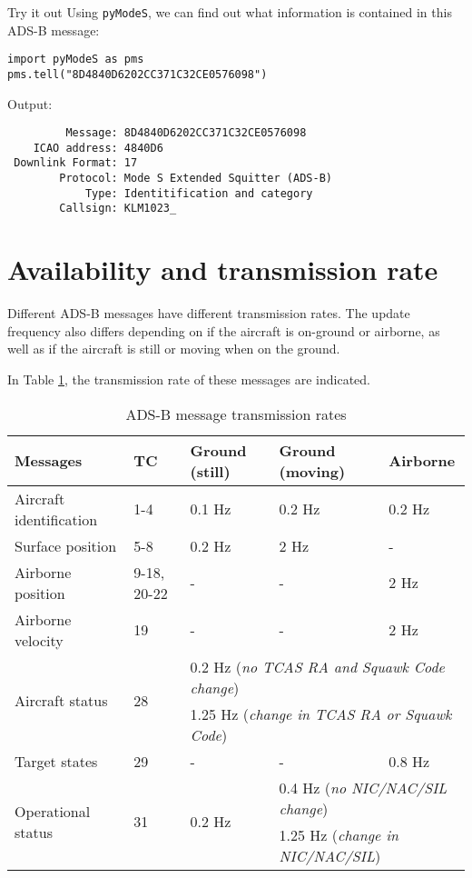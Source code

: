 \begin{notebox}{Try it out}
  Using \texttt{pyModeS}, we can find out what information is contained in this ADS-B message:

\begin{verbatim}
import pyModeS as pms
pms.tell("8D4840D6202CC371C32CE0576098")
\end{verbatim}

Output:

\begin{verbatim}
         Message: 8D4840D6202CC371C32CE0576098 
    ICAO address: 4840D6 
 Downlink Format: 17 
        Protocol: Mode S Extended Squitter (ADS-B) 
            Type: Identitification and category 
        Callsign: KLM1023_ 
\end{verbatim}
  

\end{notebox}



\section{Availability and transmission rate}

Different ADS-B messages have different transmission rates. The update frequency also differs depending on if the aircraft is on-ground or airborne, as well as if the aircraft is still or moving when on the ground.

In Table \ref{tb:adsb-transmission-rate}, the transmission rate of these messages are indicated.

\begin{table}[ht]
  \footnotesize
  \centering
  \caption{ADS-B message transmission rates}
  \label{tb:adsb-transmission-rate}
  \begin{tabular}{|l|l|l|l|l|}
  \hline
  \textbf{Messages} & \textbf{TC} & \textbf{Ground (still)} & \textbf{Ground (moving)} & \textbf{Airborne} \\ \hline
  Aircraft identification & 1-4 & 0.1 Hz & 0.2 Hz & 0.2 Hz \\ \hline
  Surface position & 5-8 & 0.2 Hz & 2 Hz & - \\ \hline
  Airborne position & 9-18, 20-22 & - & - & 2 Hz \\ \hline
  Airborne velocity & 19 & - & - & 2 Hz \\ \hline
  \multirow{2}{*}{Aircraft status} & \multirow{2}{*}{28} & \multicolumn{3}{l|}{0.2 Hz (\textit{no TCAS RA and Squawk Code change})} \\ \cline{3-5} 
   &  & \multicolumn{3}{l|}{1.25 Hz (\textit{change in TCAS RA or Squawk Code})} \\ \hline
  Target states & 29 & - & - & 0.8 Hz \\ \hline
  \multirow{2}{*}{Operational status} & \multirow{2}{*}{31} & \multirow{2}{*}{0.2 Hz} & \multicolumn{2}{l|}{0.4 Hz (\textit{no NIC/NAC/SIL change})} \\ \cline{4-5} 
   &  &  & \multicolumn{2}{l|}{1.25 Hz (\textit{change in NIC/NAC/SIL})} \\ \hline
  \end{tabular}
\end{table}

